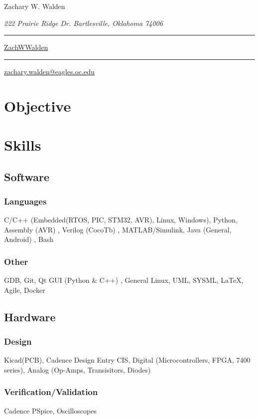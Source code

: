 \documentclass{article}
\newcommand\mybar{\kern1pt\rule[-\dp\strutbox]{.8pt}{\baselineskip}\kern1pt}
\begin{document}
\begin{center}
	\begin{Huge}
		Zachary W. Walden\\
	\end{Huge}
	\begin{large}
		\textsl{222 Prairie Ridge Dr. Bartlesville, Oklahoma 74006}\\
	\end{large}
	\begin{small}
		 \mybar { } \faGithub \href{https://github.com/ZachWWalden}{ ZachWWalden}
		\mybar { }\faEnvelope\href{mailto::zachary.walden@eagles.oc.edu}{ zachary.walden@eagles.oc.edu}
	\end{small}
\end{center}
\begin{spacing}{.5}

\section{Objective}
	\sl{\small{ }}

\begin{comment}
	\sl{\small{Seeking }}
\end{comment}

\section{Skills}
	\subsection{Software}
		\subsubsection{Languages} \small{C/C++} \scriptsize{(Embedded(RTOS, PIC, STM32, AVR), Linux, Windows)}\small{, Python, Assembly} \scriptsize{(AVR)} \small{, Verilog} \scriptsize{(CocoTb)} \small{, MATLAB/Simulink, Java} \scriptsize{(General, Android)} \small{, Bash}
		\subsubsection{Other} \small{GDB, Git, Qt GUI} \scriptsize{(Python \& C++)} \small{, General Linux, UML, SYSML, \LaTeX, Agile, Docker}
	\subsection{Hardware}
		\subsubsection{Design} \small{Kicad(PCB), Cadence Design Entry CIS, Digital} \scriptsize{(Microcontrollers, FPGA, 7400 series)}\small{, Analog} \scriptsize{(Op-Amps, Transisitors, Diodes)}
		\small{\subsubsection{Verification/Validation} Cadence PSpice, Oscilloscopes}

\end{spacing}
\end{document}
